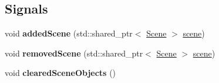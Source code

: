 \subsection*{Signals}
\begin{DoxyCompactItemize}
\item 
\mbox{\label{classrev_1_1_scenario_af8955ba90139e237f2de1bc2bf47905e}} 
void {\bfseries added\+Scene} (std\+::shared\+\_\+ptr$<$ \mbox{\hyperlink{classrev_1_1_scene}{Scene}} $>$ \mbox{\hyperlink{classrev_1_1_scenario_a26b39b4561f928b2582c83e81d42b8d0}{scene}})
\item 
\mbox{\label{classrev_1_1_scenario_a13fc874aa6311b227e2691ad0a0fb12f}} 
void {\bfseries removed\+Scene} (std\+::shared\+\_\+ptr$<$ \mbox{\hyperlink{classrev_1_1_scene}{Scene}} $>$ \mbox{\hyperlink{classrev_1_1_scenario_a26b39b4561f928b2582c83e81d42b8d0}{scene}})
\item 
\mbox{\label{classrev_1_1_scenario_ad6384993101b78266d69bf2b82c1c35b}} 
void {\bfseries cleared\+Scene\+Objects} ()
\end{DoxyCompactItemize}
